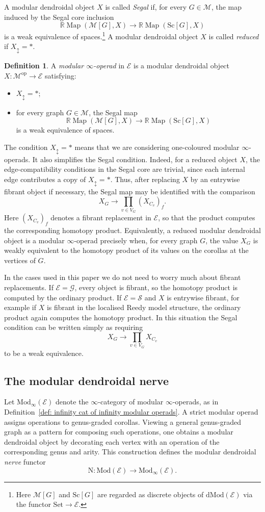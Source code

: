 \documentclass{amsart}
\newcommand{\bE}{\mathscr{E}}
\newcommand{\bM}{\mathscr{M}}
\newcommand{\sSet}{\mathscr{S}}
\newcommand{\Set}{\mathrm{Set}}
\newcommand{\Grpd}{\mathscr{G}}
\newcommand{\Mod}{\mathrm{Mod}}
\newcommand{\dMod}{\mathrm{dMod}}
\newcommand{\Sc}{\mathrm{Sc}}
\newcommand{\nerve}{\mathrm{N}}
\newcommand{\Map}{\operatorname{Map}}
\newcommand{\corolla}{C}
\theoremstyle{definition}
\newtheorem{definition}[theorem]{Definition}%
\numberwithin{equation}{section}
\begin{document}
A modular dendroidal object $X$ is called \emph{Segal} if, for every $G\in\bM$, the map induced by the Segal core inclusion
\[
\mathbb{R}\Map(\bM[G],X) \longrightarrow \mathbb{R}\Map(\Sc[G],X)
\]
is a weak equivalence of spaces.\footnote{Here $\bM[G]$ and $\Sc[G]$ are regarded as discrete objects of $\dMod(\bE)$ via the functor $\Set\to\bE$.} A modular dendroidal object $X$ is called \emph{reduced} if $X_{\updownarrow}=*$.
\begin{definition}\label{def: infty modular}
A \emph{modular $\infty$-operad} in $\bE$ is a modular dendroidal object
$X:\bM^{\mathrm{op}}\to\bE$ satisfying:
\begin{itemize}
    \item $X_{\updownarrow}=*$;
    \item for every graph $G\in\bM$, the Segal map
    \[
    \mathbb{R}\Map(\bM[G],X)
    \longrightarrow
    \mathbb{R}\Map(\Sc[G],X)
    \]
    is a weak equivalence of spaces.
\end{itemize}
\end{definition}

The condition $X_{\updownarrow}=*$ means that we are considering one-coloured modular $\infty$-operads. It also simplifies the Segal condition. Indeed, for a reduced object $X$, the edge-compatibility conditions in the Segal core are trivial, since each internal edge contributes a copy of $X_{\updownarrow}=*$. Thus, after replacing $X$ by an entrywise fibrant object if necessary, the Segal map may be identified with the comparison
\[
X_G \longrightarrow \prod_{v\in V_G} (X_{\corolla_v})_f .
\]
Here $(X_{\corolla_v})_f$ denotes a fibrant replacement in $\bE$, so that the product computes the corresponding homotopy product. Equivalently, a reduced
modular dendroidal object is a modular $\infty$-operad precisely when, for every graph $G$, the value $X_G$ is weakly equivalent to the homotopy product
of its values on the corollas at the vertices of $G$. 

In the cases used in this paper we do not need to worry much about fibrant replacements. If $\bE=\Grpd$, every object is fibrant, so the homotopy product is computed by the ordinary product. If $\bE=\sSet$ and $X$ is entrywise fibrant, for example if $X$ is fibrant in the localised Reedy model structure, the ordinary product again computes the homotopy product. In this situation the Segal condition can be written simply as requiring
\[
X_G \longrightarrow \prod_{v\in V_G} X_{\corolla_v}
\]
to be a weak equivalence.

\subsection{The modular dendroidal nerve}
Let $\Mod_{\infty}(\bE)$ denote the $\infty$-category of modular $\infty$-operads, as in Definition~\ref{def: infinity cat of infinity modular operads}.
A strict modular operad assigns operations to genus-graded corollas. Viewing a general genus-graded graph as a pattern for composing such operations, one obtains a modular dendroidal object by decorating each vertex with an operation of the corresponding genus and arity. This construction defines the modular dendroidal \emph{nerve} functor
\[
\nerve:\Mod(\bE)\longrightarrow \Mod_{\infty}(\bE).
\]
\end{document}

